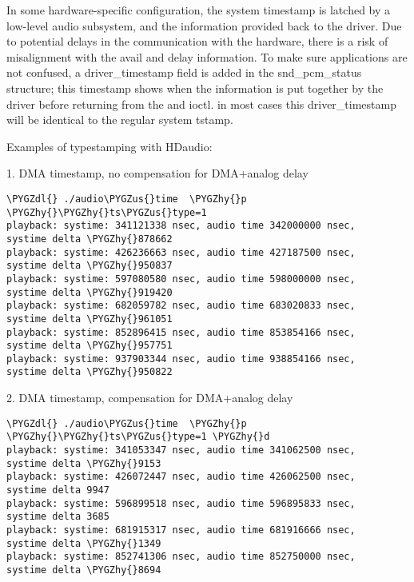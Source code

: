 \documentclass[a4paper,8pt,english]{sphinxmanual}
\def\PYGZus{\char`\_}
\def\PYGZdl{\char`\$}
\def\PYGZhy{\char`\-}
\begin{document}
In some hardware-specific configuration, the system timestamp is
latched by a low-level audio subsystem, and the information provided
back to the driver. Due to potential delays in the communication with
the hardware, there is a risk of misalignment with the avail and delay
information. To make sure applications are not confused, a
driver\_timestamp field is added in the snd\_pcm\_status structure; this
timestamp shows when the information is put together by the driver
before returning from the  and  ioctl. in most cases
this driver\_timestamp will be identical to the regular system tstamp.

Examples of typestamping with HDaudio:

1. DMA timestamp, no compensation for DMA+analog delay

\begin{Verbatim}[commandchars=\\\{\}]
\PYGZdl{} ./audio\PYGZus{}time  \PYGZhy{}p \PYGZhy{}\PYGZhy{}ts\PYGZus{}type=1
playback: systime: 341121338 nsec, audio time 342000000 nsec,         systime delta \PYGZhy{}878662
playback: systime: 426236663 nsec, audio time 427187500 nsec,         systime delta \PYGZhy{}950837
playback: systime: 597080580 nsec, audio time 598000000 nsec,         systime delta \PYGZhy{}919420
playback: systime: 682059782 nsec, audio time 683020833 nsec,         systime delta \PYGZhy{}961051
playback: systime: 852896415 nsec, audio time 853854166 nsec,         systime delta \PYGZhy{}957751
playback: systime: 937903344 nsec, audio time 938854166 nsec,         systime delta \PYGZhy{}950822
\end{Verbatim}

2. DMA timestamp, compensation for DMA+analog delay

\begin{Verbatim}[commandchars=\\\{\}]
\PYGZdl{} ./audio\PYGZus{}time  \PYGZhy{}p \PYGZhy{}\PYGZhy{}ts\PYGZus{}type=1 \PYGZhy{}d
playback: systime: 341053347 nsec, audio time 341062500 nsec,         systime delta \PYGZhy{}9153
playback: systime: 426072447 nsec, audio time 426062500 nsec,         systime delta 9947
playback: systime: 596899518 nsec, audio time 596895833 nsec,         systime delta 3685
playback: systime: 681915317 nsec, audio time 681916666 nsec,         systime delta \PYGZhy{}1349
playback: systime: 852741306 nsec, audio time 852750000 nsec,         systime delta \PYGZhy{}8694
\end{Verbatim}
\end{document}
